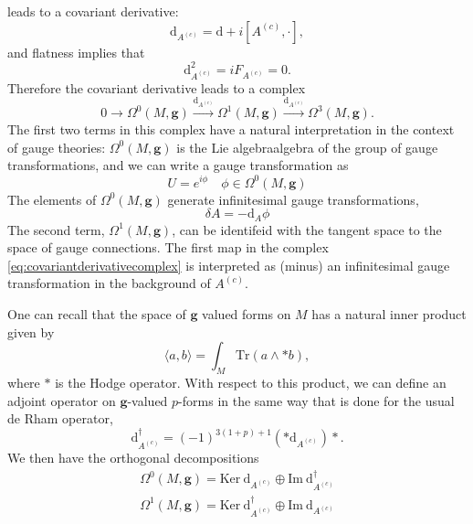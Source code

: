  leads to a covariant derivative:
 \begin{equation}
   \mathrm{d}_{A^{(c)}} = \mathrm{d} + i[A^(c),\cdot],
   \label{eq:covariantderivative}
 \end{equation}
 and flatness implies that
 \begin{equation}
   \mathrm{d}^2_{A^{(c)}} = iF_{A^{(c)}} = 0.
 \end{equation}
 Therefore the covariant derivative leads to a complex
 \begin{equation}
   0\rightarrow\Omega^{0}(M,\mathbf{g})\xrightarrow{\mathrm{d}_{A^{(c)}}}\Omega^{1}(M,\mathbf{g})\xrightarrow{\mathrm{d}_{A^{(c)}}}\Omega^{3}(M,\mathbf{g}).
   \label{eq:covariantderivativecomplex}
 \end{equation}
 The first two terms in this complex have a natural interpretation
 in the context of gauge theories: $\Omega^{0}(M,\mathbf{g})$ is the Lie
 algebraalgebra of the  group of gauge transformations, and we can
 write a gauge transformation as 
 \begin{equation}
   U = e^{i\phi}\quad \phi\in\Omega^{0}(M,\mathbf{g})
 \end{equation}
 The elements of $\Omega^{0}(M,\mathbf{g})$ generate infinitesimal
 gauge transformations,
 \begin{equation}
   \delta A = - \mathrm{d}_A\phi
 \end{equation}
 The second term, $\Omega^{1}(M,\mathbf{g})$, can be identifeid with the
 tangent space to the space of gauge connections. The first map in the complex
 \eqref{eq:covariantderivativecomplex} is interpreted as (minus) an
 infinitesimal gauge transformation in the background of $A^{(c)}$.
 \par One can recall that the space of $\mathbf{g}$ valued forms on $M$ has
 a natural inner product given by
 \begin{equation}
   \langle a,b \rangle = \int_M\mathrm{Tr}(a\wedge \ast b),
 \end{equation}
where $\ast$ is the Hodge operator. With respect to this product, we can define
an adjoint operator on $\mathbf{g}$-valued $p$-forms in the same
way that is done for the usual de Rham operator,
\begin{equation}
  \mathrm{d}^\dagger_{A^{(c)}} = (-1)^{3(1+p)+1}(\ast \mathrm{d}_{A^{(c)}})\ast .
\end{equation}
We then have the orthogonal decompositions
\begin{gather}
  \Omega^{0}(M,\mathbf{g})
  = \mathrm{Ker}\:\mathrm{d}_{A^{(c)}}\oplus\mathrm{Im}\:\mathrm{d}^\dagger_{A^{(c)}}\nonumber\\
  \Omega^{1}(M,\mathbf{g})
  = \mathrm{Ker}\:\mathrm{d}^\dagger_{A^{(c)}}\oplus\mathrm{Im}\:\mathrm{d}_{A^{(c)}}
  \label{eq:orthogonaldecomposition}
\end{gather}
